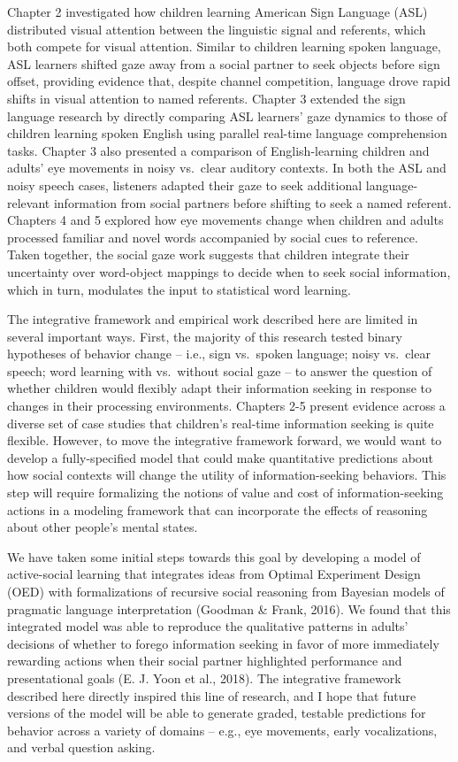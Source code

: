 \documentclass[oneside]{report}
\begin{document}
Chapter 2 investigated how children learning American Sign Language
(ASL) distributed visual attention between the linguistic signal and
referents, which both compete for visual attention. Similar to children
learning spoken language, ASL learners shifted gaze away from a social
partner to seek objects before sign offset, providing evidence that,
despite channel competition, language drove rapid shifts in visual
attention to named referents. Chapter 3 extended the sign language
research by directly comparing ASL learners' gaze dynamics to those of
children learning spoken English using parallel real-time language
comprehension tasks. Chapter 3 also presented a comparison of
English-learning children and adults' eye movements in noisy vs.~clear
auditory contexts. In both the ASL and noisy speech cases, listeners
adapted their gaze to seek additional language-relevant information from
social partners before shifting to seek a named referent. Chapters 4 and
5 explored how eye movements change when children and adults processed
familiar and novel words accompanied by social cues to reference. Taken
together, the social gaze work suggests that children integrate their
uncertainty over word-object mappings to decide when to seek social
information, which in turn, modulates the input to statistical word
learning.

The integrative framework and empirical work described here are limited
in several important ways. First, the majority of this research tested
binary hypotheses of behavior change -- i.e., sign vs.~spoken language;
noisy vs.~clear speech; word learning with vs.~without social gaze -- to
answer the question of whether children would flexibly adapt their
information seeking in response to changes in their processing
environments. Chapters 2-5 present evidence across a diverse set of case
studies that children's real-time information seeking is quite flexible.
However, to move the integrative framework forward, we would want to
develop a fully-specified model that could make quantitative predictions
about how social contexts will change the utility of information-seeking
behaviors. This step will require formalizing the notions of value and
cost of information-seeking actions in a modeling framework that can
incorporate the effects of reasoning about other people's mental states.

We have taken some initial steps towards this goal by developing a model
of active-social learning that integrates ideas from Optimal Experiment
Design (OED) with formalizations of recursive social reasoning from
Bayesian models of pragmatic language interpretation (Goodman \& Frank,
2016). We found that this integrated model was able to reproduce the
qualitative patterns in adults' decisions of whether to forego
information seeking in favor of more immediately rewarding actions when
their social partner highlighted performance and presentational goals
(E. J. Yoon et al., 2018). The integrative framework described here
directly inspired this line of research, and I hope that future versions
of the model will be able to generate graded, testable predictions for
behavior across a variety of domains -- e.g., eye movements, early
vocalizations, and verbal question asking.
\end{document}
